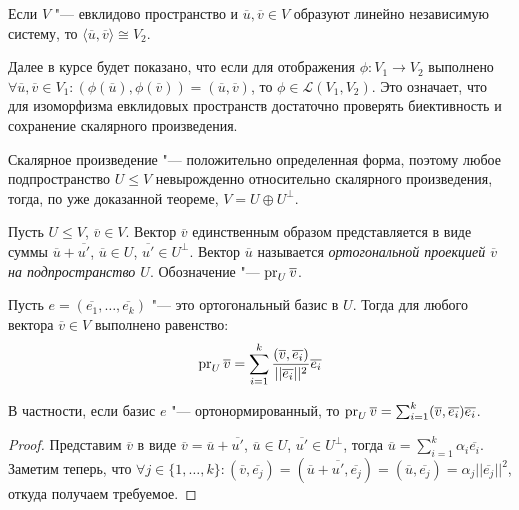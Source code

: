 \begin{note}
	Если $V$ "--- евклидово пространство и $\overline{u}, \overline{v} \in V$ образуют линейно независимую систему, то $\langle\overline{u}, \overline{v}\rangle \cong V_2$.
\end{note}

\begin{note}
	Далее в курсе будет показано, что если для отображения $\phi: V_1 \rightarrow V_2$ выполнено $\forall \overline{u}, \overline{v} \in V_1: (\phi(\overline{u}), \phi(\overline{v})) = (\overline{u}, \overline{v})$, то $\phi \in \mathcal{L}(V_1, V_2)$. Это означает, что для изоморфизма евклидовых пространств достаточно проверять биективность и сохранение скалярного произведения.
\end{note}

\begin{note}
	Скалярное произведение "--- положительно определенная форма, поэтому любое подпространство $U \le V$ невырожденно относительно скалярного произведения, тогда, по уже доказанной теореме, $V = U \oplus U^\perp$.
\end{note}

\begin{definition}
	Пусть $U \le V$, $\overline{v} \in V$. Вектор $\overline{v}$ единственным образом представляется в виде суммы $\overline{u} + \overline{u'}$, $\overline{u} \in U$, $\overline{u'} \in U^\perp$. Вектор $\overline{u}$ называется \textit{ортогональной проекцией $\overline{v}$ на подпространство $U$}. Обозначение "--- $\operatorname{pr}_U{\overline{v}}$.
\end{definition}

\begin{proposition}
	Пусть $e = (\overline{e_1}, \dots, \overline{e_k})$ "--- это ортогональный базис в $U$. Тогда для любого вектора $\overline{v} \in V$ выполнено равенство:
	\[\operatorname{pr}_U{\overline{v}} = \sum_{i = 1}^k\frac{(\overline{v}, \overline{e_i})}{||\overline{e_i}||^2}\overline{e_i}\]
	
	В частности, если базис $e$ "--- ортонормированный, то $\operatorname{pr}_U{\overline{v}} = \sum_{i = 1}^k(\overline{v}, \overline{e_i})\overline{e_i}$.
\end{proposition}

\begin{proof}
	Представим $\overline{v}$ в виде $\overline{v} = \overline{u} + \overline{u'}$, $\overline{u} \in U$, $\overline{u'} \in U^\perp$, тогда $\overline{u} = \sum_{i = 1}^k\alpha_i\overline{e_i}$. Заметим теперь, что $\forall j \in \{1, \dots, k\}: (\overline{v}, \overline{e_j}) = (\overline{u} + \overline{u'}, \overline{e_j}) = (\overline{u}, \overline{e_j}) = \alpha_j||\overline{e_j}||^2$, откуда получаем требуемое.
\end{proof}

